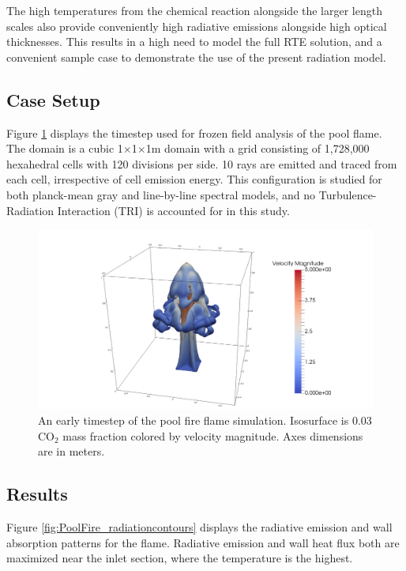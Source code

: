 The high temperatures from the chemical reaction alongside the larger length scales also provide conveniently high radiative emissions alongside high optical thicknesses. 
This results in a high need to model the full RTE solution, and a convenient sample case to demonstrate the use of the present radiation model.

\subsection{Case Setup}
Figure \ref{fig:PoolFire_diagram} displays the timestep used for frozen field analysis of the pool flame. The domain is a cubic 1$\times$1$\times$1m domain with a grid consisting of 1,728,000 hexahedral cells with 120 divisions per side.
10 rays are emitted and traced from each cell, irrespective of cell emission energy.
This configuration is studied for both planck-mean gray and line-by-line spectral models, and no Turbulence-Radiation Interaction (TRI) is accounted for in this study.

\begin{figure}
\includegraphics[width=\linewidth]{figures/ch4/contour_early.png}
\caption{An early timestep of the pool fire flame simulation. Isosurface is 0.03 CO$_2$ mass fraction colored by velocity magnitude. Axes dimensions are in meters.}
\label{fig:PoolFire_diagram}
\end{figure}

\subsection{Results}
Figure \ref{fig:PoolFire_radiationcontours} displays the radiative emission and wall absorption patterns for the flame. Radiative emission and wall heat flux both are maximized near the inlet section, where the temperature is the highest.

